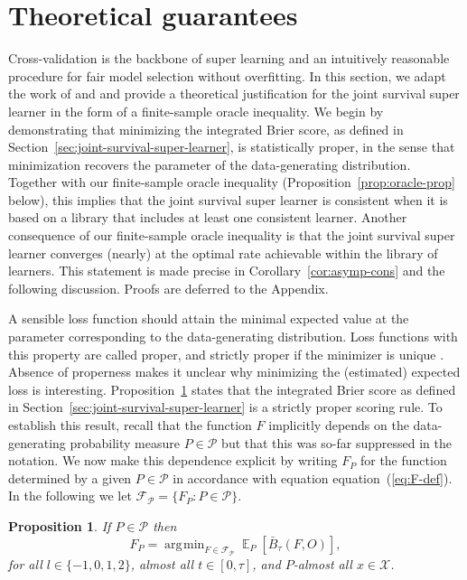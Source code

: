 \documentclass[a4paper,danish]{article}
\DeclareMathOperator{\E}{\mathbb{E}} %
\newcommand{\1}{\mathds{1}}
\DeclareMathOperator*{\argmin}{\arg\!\min}
\theoremstyle{plain} %
\numberwithin{theorem}{section}
\newtheorem{proposition}[theorem]{Proposition}
\theoremstyle{definition} %
\theoremstyle{remark}
\begin{document}
\section{Theoretical guarantees}
\label{sec:theor-results-prop}

Cross-validation is the backbone of super learning and an intuitively
reasonable procedure for fair model selection without overfitting. In
this section, we adapt the work of \cite{van2003unicv} and
\cite{vaart2006oracle} and provide a theoretical justification for the
joint survival super learner in the form of a finite-sample oracle
inequality. We begin by demonstrating that minimizing the integrated
Brier score, as defined in
Section~\ref{sec:joint-survival-super-learner}, is statistically
proper, in the sense that minimization recovers the parameter of the
data-generating distribution. Together with our finite-sample oracle
inequality (Proposition~\ref{prop:oracle-prop} below), this implies
that the joint survival super learner is consistent when it is based
on a library that includes at least one consistent learner. Another
consequence of our finite-sample oracle inequality is that the joint
survival super learner converges (nearly) at the optimal rate
achievable within the library of learners. This statement is made
precise in Corollary~\ref{cor:asymp-cons} and the following
discussion. Proofs are deferred to the Appendix.

A sensible loss function should attain the minimal expected value at
the parameter corresponding to the data-generating distribution. Loss
functions with this property are called proper, and strictly proper if
the minimizer is unique \citep{gneiting2007strictly}. Absence of
properness makes it unclear why minimizing the (estimated) expected
loss is interesting.  Proposition~\ref{prop:stric-prop} states that
the integrated Brier score as defined in
Section~\ref{sec:joint-survival-super-learner} is a strictly proper
scoring rule. To establish this result, recall that the function \(F\)
implicitly depends on the data-generating probability measure
\(P\in\mathcal P\) but that this was so-far suppressed in the
notation. We now make this dependence explicit by writing \(F_P\) for
the function determined by a given \(P \in\mathcal{P}\) in accordance
with equation equation~(\ref{eq:F-def}). In the following we let \(
\mathcal{F}_{\mathcal{P}} = \{F_P : P \in \mathcal{P}\} \).

\begin{proposition} 
  \label{prop:stric-prop}
  If \(P \in\mathcal{P}\) then
  \begin{equation*}
    F_P = \argmin_{F \in \mathcal{F}_{\mathcal{P}}}
    \E_P{[\bar{B}_\tau(F, O)]}
    ,
  \end{equation*}
  for all \( l \in \{-1, 0, 1, 2 \} \), almost all
  \( t \in [0,\tau] \), and \( P \)-almost all
  \( x \in \mathcal{X} \).
\end{proposition}
\end{document}
